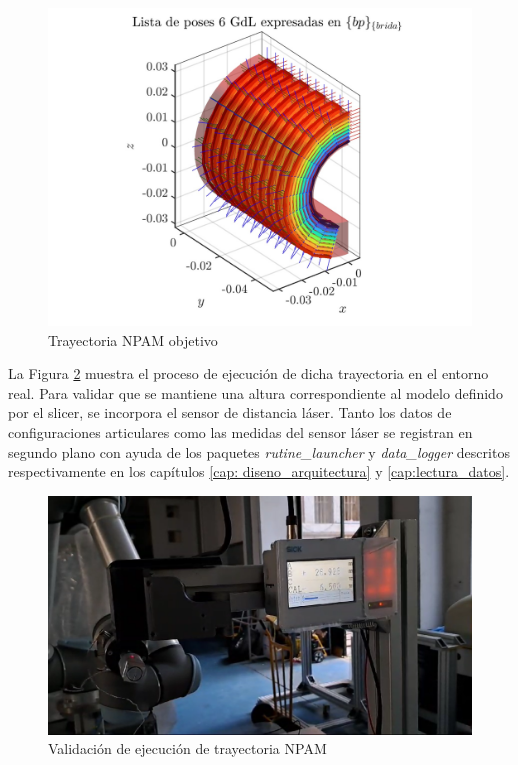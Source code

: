 \begin{figure}[h!]
    \centering
    \includegraphics[scale=0.15]{figuras/validacion trayectoria npam trayectoria objetivo.jpg}
    \caption{Trayectoria \acrshort{NPAM} objetivo}
    \label{fig: validacion trayectoria objetivo}
\end{figure}

La Figura \ref{fig: validacion trayectoria npam ensayo realidad} muestra el proceso de ejecución de dicha trayectoria en el entorno real. Para validar que se mantiene una altura correspondiente al modelo definido por el slicer, se incorpora el sensor de distancia láser. Tanto los datos de configuraciones articulares como las medidas del sensor láser se registran en segundo plano con ayuda de los paquetes \textit{rutine\_launcher} y \textit{data\_logger} descritos respectivamente en los capítulos \ref{cap: diseno_arquitectura} y \ref{cap:lectura_datos}.

\begin{figure}[h!]
    \centering
    \includegraphics[scale=0.28]{figuras/validacion trayectoria npam ensayo realidad.png}
    \caption{Validación de ejecución de trayectoria \acrshort{NPAM}}
    \label{fig: validacion trayectoria npam ensayo realidad}
\end{figure}

